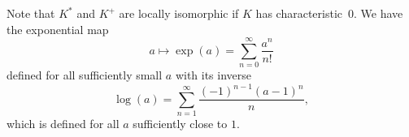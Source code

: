 \begin{remark}
Note that $K^*$ and $K^+$ are locally isomorphic if $K$ has
characteristic~$0$.   We have the exponential map
$$
a \mapsto \exp(a) = \sum_{n=0}^{\infty} \frac{a^n}{n!}
$$
defined for all sufficiently small $a$ with its inverse
$$
\log(a) = \sum_{n=1}^{\infty} \frac{(-1)^{n-1}(a-1)^n}{n},
$$
which is defined for all $a$ sufficiently close to $1$.
\end{remark}

